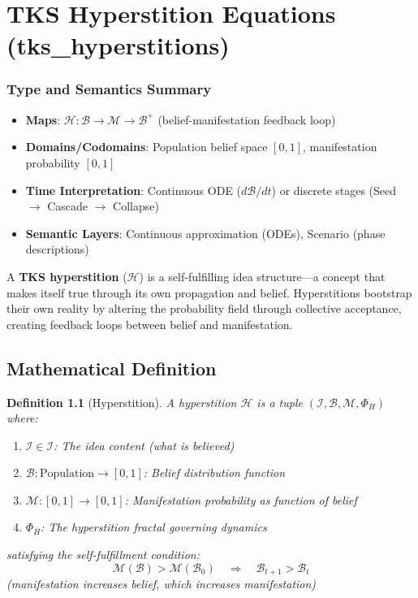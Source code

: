 \documentclass[11pt,twoside]{book}
\newcommand{\Ideas}{\mathcal{I}}
\newcommand{\Frac}{\Phi}
\newcommand{\Hyperstition}{\mathcal{H}}
\newtheorem{definition}{Definition}[chapter]
\begin{document}
\chapter{TKS Hyperstition Equations (tks\_hyperstitions)}
\label{ch:hyperstitions}

\subsection*{Type and Semantics Summary}
\begin{itemize}
    \item \textbf{Maps}: $\Hyperstition : \mathcal{B} \to \mathcal{M} \to \mathcal{B}^+$ (belief-manifestation feedback loop)
    \item \textbf{Domains/Codomains}: Population belief space $[0,1]$, manifestation probability $[0,1]$
    \item \textbf{Time Interpretation}: Continuous ODE ($d\mathcal{B}/dt$) or discrete stages (Seed $\to$ Cascade $\to$ Collapse)
    \item \textbf{Semantic Layers}: Continuous approximation (ODEs), Scenario (phase descriptions)
\end{itemize}

\begin{tcolorbox}[colback=cyan!5!white,colframe=cyan!75!black,title=\textbf{Definition: TKS Hyperstition},breakable]
A \textbf{TKS hyperstition} ($\Hyperstition$) is a self-fulfilling idea structure---a
concept that makes itself true through its own propagation and belief. Hyperstitions
bootstrap their own reality by altering the probability field through collective
acceptance, creating feedback loops between belief and manifestation.
\end{tcolorbox}

\section{Mathematical Definition}

\begin{definition}[Hyperstition]
\label{def:hyperstition}
A \emph{hyperstition} $\Hyperstition$ is a tuple $(\mathcal{I}, \mathcal{B}, \mathcal{M}, \Frac_H)$ where:
\begin{enumerate}[label=(\roman*)]
    \item $\mathcal{I} \in \Ideas$: The idea content (what is believed)
    \item $\mathcal{B}: \mathrm{Population} \to [0,1]$: Belief distribution function
    \item $\mathcal{M}: [0,1] \to [0,1]$: Manifestation probability as function of belief
    \item $\Frac_H$: The hyperstition fractal governing dynamics
\end{enumerate}
satisfying the \emph{self-fulfillment condition}:
\[
    \mathcal{M}(\mathcal{B}) > \mathcal{M}(\mathcal{B}_0) \quad \Rightarrow \quad
    \mathcal{B}_{t+1} > \mathcal{B}_t
\]
(manifestation increases belief, which increases manifestation)
\end{definition}
\end{document}
